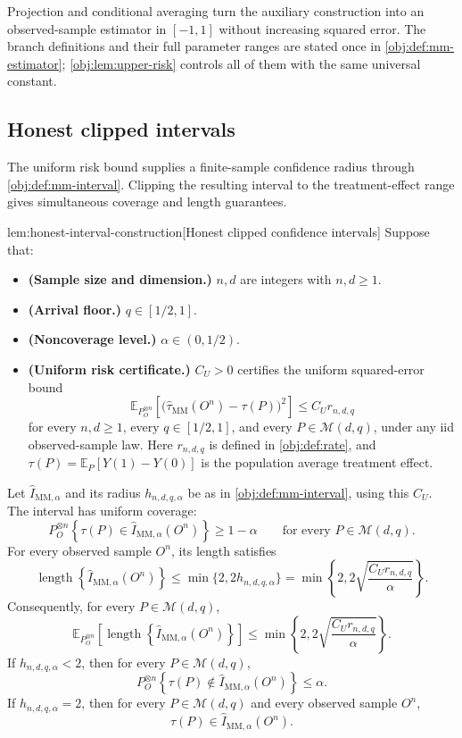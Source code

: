 \documentclass[11pt]{article}
\begin{document}
Projection and conditional averaging turn the auxiliary construction into an observed-sample estimator in \([-1,1]\) without increasing squared error. The branch definitions and their full parameter ranges are stated once in \cref{obj:def:mm-estimator}; \cref{obj:lem:upper-risk} controls all of them with the same universal constant.

\subsection{Honest clipped intervals}

The uniform risk bound supplies a finite-sample confidence radius through \cref{obj:def:mm-interval}. Clipping the resulting interval to the treatment-effect range gives simultaneous coverage and length guarantees.

\begin{lemmav}{lem:honest-interval-construction}[Honest clipped confidence intervals]
Suppose that:
\begin{itemize}
\item \textbf{(Sample size and dimension.)} \(n,d\) are integers with \(n,d\ge 1\).
\item \textbf{(Arrival floor.)} \(q\in[1/2,1]\).
\item \textbf{(Noncoverage level.)} \(\alpha\in(0,1/2)\).
\item \textbf{(Uniform risk certificate.)} \(C_U>0\) certifies the uniform squared-error bound
\[
\mathbb E_{P_O^{\otimes n}}
\left[
  \bigl(\widehat\tau_{\mathrm{MM}}(O^n)-\tau(P)\bigr)^2
\right]
\le C_U r_{n,d,q}
\]
for every \(n,d\ge1\), every \(q\in[1/2,1]\), and every \(P\in\mathcal M(d,q)\), under any iid observed-sample law. Here \(r_{n,d,q}\) is defined in \cref{obj:def:rate}, and
\(\tau(P)=\mathbb E_P[Y(1)-Y(0)]\) is the population average treatment effect.
\end{itemize}
Let \(\widehat I_{\mathrm{MM},\alpha}\) and its radius \(h_{n,d,q,\alpha}\) be as in \cref{obj:def:mm-interval}, using this \(C_U\). The interval has uniform coverage:
\[
P_O^{\otimes n}
\left\{
  \tau(P)\in\widehat I_{\mathrm{MM},\alpha}(O^n)
\right\}
\ge 1-\alpha
\qquad
\text{for every }P\in\mathcal M(d,q).
\]
For every observed sample \(O^n\), its length satisfies
\[
\operatorname{length}
\left\{\widehat I_{\mathrm{MM},\alpha}(O^n)\right\}
\le
\min\{2,2h_{n,d,q,\alpha}\}
=
\min\left\{2,2\sqrt{\frac{C_Ur_{n,d,q}}{\alpha}}\right\}.
\]
Consequently, for every \(P\in\mathcal M(d,q)\),
\[
\mathbb E_{P_O^{\otimes n}}
\left[
  \operatorname{length}
  \left\{\widehat I_{\mathrm{MM},\alpha}(O^n)\right\}
\right]
\le
\min\left\{2,2\sqrt{\frac{C_Ur_{n,d,q}}{\alpha}}\right\}.
\]
If \(h_{n,d,q,\alpha}<2\), then for every \(P\in\mathcal M(d,q)\),
\[
P_O^{\otimes n}
\left\{
  \tau(P)\notin\widehat I_{\mathrm{MM},\alpha}(O^n)
\right\}
\le\alpha.
\]
If \(h_{n,d,q,\alpha}=2\), then for every \(P\in\mathcal M(d,q)\) and every observed sample \(O^n\),
\[
\tau(P)\in\widehat I_{\mathrm{MM},\alpha}(O^n).
\]
\end{lemmav}
\end{document}
